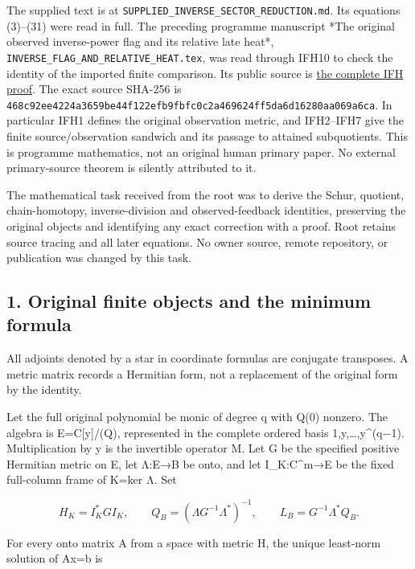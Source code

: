 \documentclass[11pt]{article}
\begin{document}
The supplied text is at \nolinkurl{SUPPLIED_INVERSE_SECTOR_REDUCTION.md}. Its equations (3)--(31) were read in full. The preceding programme manuscript *The original observed inverse-power flag and its relative late heat*, \nolinkurl{INVERSE_FLAG_AND_RELATIVE_HEAT.tex}, was read through IFH10 to check the identity of the imported finite comparison. Its public source is \href{https://github.com/KokunoYumeto/zeta-function-research-reader/blob/edd4008690952fb8568a01744e49ad7e180401e9/workbenches/splitzero-tandem/continuations/20260921-original-observation/INVERSE_FLAG_AND_RELATIVE_HEAT.tex}{the complete IFH proof}. The exact source SHA-256 is \nolinkurl{468c92ee4224a3659be44f122efb9fbfc0c2a469624ff5da6d16280aa069a6ca}. In particular IFH1 defines the original observation metric, and IFH2--IFH7 give the finite source/observation sandwich and its passage to attained subquotients. This is programme mathematics, not an original human primary paper. No external primary-source theorem is silently attributed to it.

The mathematical task received from the root was to derive the Schur, quotient, chain-homotopy, inverse-division and observed-feedback identities, preserving the original objects and identifying any exact correction with a proof. Root retains source tracing and all later equations. No owner source, remote repository, or publication was changed by this task.

\subsection{1. Original finite objects and the minimum formula}\label{original-finite-objects-and-the-minimum-formula}

All adjoints denoted by a star in coordinate formulas are conjugate transposes. A metric matrix records a Hermitian form, not a replacement of the original form by the identity.

Let the full original polynomial be monic of degree q with Q(0) nonzero. The algebra is E=C{[}y{]}/(Q), represented in the complete ordered basis 1,y,\ldots,y\^{}(q−1). Multiplication by y is the invertible operator M. Let G be the specified positive Hermitian metric on E, let Λ:E→B be onto, and let I\_K:C\^{}m→E be the fixed full-column frame of K=ker Λ. Set

\[
H_K=I_K^*GI_K,\qquad
Q_B=(\Lambda G^{-1}\Lambda^*)^{-1},\qquad
L_B=G^{-1}\Lambda^*Q_B.
\]

For every onto matrix A from a space with metric H, the unique least-norm solution of Ax=b is
\end{document}
